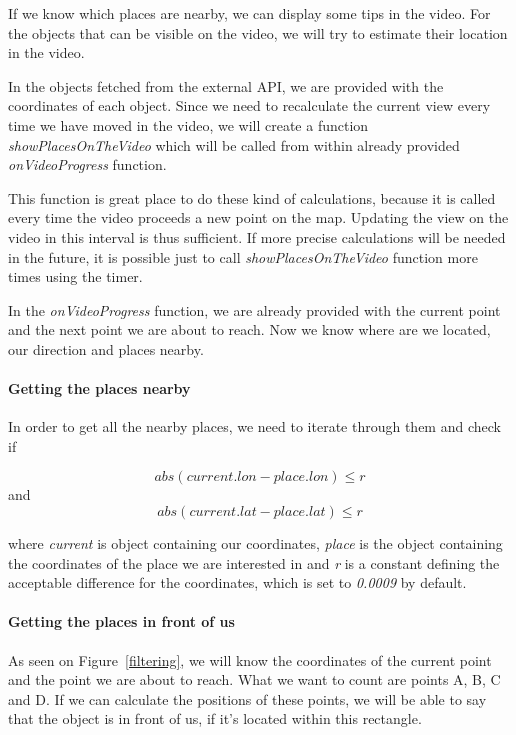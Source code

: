 \documentclass[journal]{IEEEtran}
\begin{document}
If we know which places are nearby, we can display some tips in the video. For the objects that can be visible on the video, we will try to estimate their location in the video.

In the objects fetched from the external API, we are provided with the coordinates of each object. Since we need to recalculate the current view every time we have moved in the video, we will create a function \textit{showPlacesOnTheVideo} which will be called from within already provided \textit{onVideoProgress} function.

	This function is great place to do these kind of calculations, because it is called every time the video proceeds a new point on the map. Updating the view on the video in this interval is thus sufficient. If more precise calculations will be needed in the future, it is possible just to call \textit{showPlacesOnTheVideo} function more times using the timer.
	
	In the \textit{onVideoProgress} function, we are already provided with the current point and the next point we are about to reach. Now we know where are we located, our direction and places nearby.

\paragraph{Getting the places nearby}

In order to get all the nearby places, we need to iterate through them and check if 


\begin{displaymath}
abs(current.lon - place.lon) \leq r
\end{displaymath}
and
\begin{displaymath}
abs(current.lat - place.lat) \leq r
\end{displaymath}

 where \textit{current} is object containing our coordinates, \textit{place} is the object containing the coordinates of the place we are interested in and \textit{r} is a constant defining the acceptable difference for the coordinates, which is set to \textit{0.0009} by default.

\paragraph{Getting the places in front of us}

As seen on Figure~\ref{filtering}, we will know the coordinates of the current point and the point we are about to reach. What we want to count are points A, B, C and D. If we can calculate the positions of these points, we will be able to say that the object is in front of us, if it's located within this rectangle.
\end{document}
